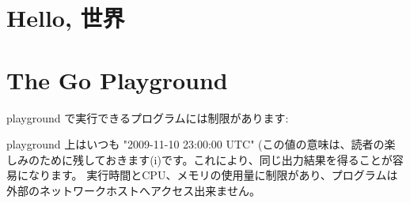 \section{Hello, 世界}




\section{The Go Playground}

playground で実行できるプログラムには制限があります:

playground 上はいつも "2009-11-10 23:00:00 UTC" (この値の意味は、読者の楽しみのために残しておきます(^^))です。これにより、同じ出力結果を得ることが容易になります。
実行時間とCPU、メモリの使用量に制限があり、プログラムは外部のネットワークホストへアクセス出来ません。





